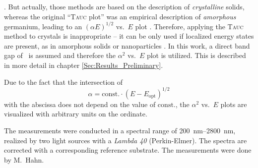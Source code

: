     \cite{cheng1996,al-kuhaili2007,singh2019,farrell2015}.
But actually, those methods are based on the description of \emph{crystalline} solids, whereas the original \enquote{\textsc{Tauc} plot} was an empirical description of \emph{amorphous} germanium, leading to an $(\alpha E)^{1/2}$ vs.\ $E$ plot
    \cite{tauc2005}.
Therefore, applying the \textsc{Tauc} method to crystals is inappropriate -- it can be only used if localized energy states are present, as in amorphous solids or nanoparticles
    \cite{dolgonos2016}.
In this work, a direct band gap of \cro\ is assumed and therefore the $\alpha^2$ vs.\ $E$ plot is utilized.
This is described in more detail in chapter \ref{Sec:Results_Preliminary}.

Due to the fact that the intersection of 
\begin{equation*}
    \alpha=\mathrm{const.}\cdot(E-E_\mathrm{opt})^{1/2}
\end{equation*}
with the abscissa does not depend on the value of $\mathrm{const.}$, the $\alpha^2$ vs.\ $E$ plots are visualized with arbitrary units on the ordinate.

The measurements were conducted in a spectral range of \qtyrange{200}{2800}{\nm}, realized by two light sources with a \textit{Lambda 40} (Perkin-Elmer).
The spectra are corrected with a corresponding reference substrate.
The measurements were done by M.\ Hahn.